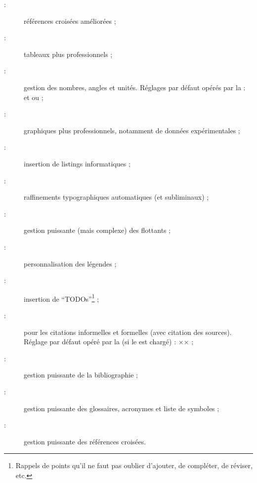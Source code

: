\begin{description}
\item[ :] références croisées améliorées ;
\item[ :] tableaux plus professionnels ;
\item[ :] gestion des nombres, angles et unités. Réglages par
  défaut opérés par la \yatcl :  et  ou
  \selonlangue{} ;
\item[ :] graphiques plus professionnels,
  notamment de données expérimentales ;
\item[ :] insertion de listings informatiques ;
\item[ :] raffinements typographiques
  automatiques (et subliminaux) ;
\item[ :] gestion puissante (mais complexe) des
  flottants ;
\item[ :] personnalisation des légendes ;
\item[ :] insertion de
  \foreignquote{english}{TODOs}\footnote{Rappels de points qu'il ne
    faut pas oublier d'ajouter, de compléter, de réviser, etc.} ;
\item[ :] pour les citations informelles et formelles (avec
  citation des sources). Réglage par défaut opéré par la \yatcl (si le
   est chargé) : ×\SetCiteCommand{\autocite}× ;
\item[ :] gestion puissante de la bibliographie ;
\item[ :] gestion puissante des glossaires,
  acronymes et liste de symboles ;
\item[ :] gestion puissante des références croisées.
\end{description}

%
\iffalse
\fi
